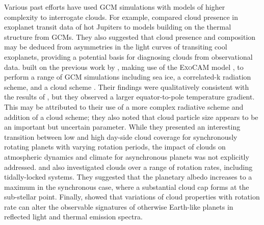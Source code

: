 Various past efforts have used GCM simulations with models of higher complexity to interrogate clouds. For example, \citet{parmentier2016-TRANSITIONS} compared cloud presence in exoplanet transit data of hot Jupiters to models building on the thermal structure from GCMs. They also suggested that cloud presence and composition may be deduced from asymmetries in the light curves of transiting cool exoplanets, providing a potential basis for diagnosing clouds from observational data. \citet{komacek2019-Atmospheric} built on the previous work by \citet{kaspi2015-ATMOSPHERIC}, making use of the \textsc{ExoCAM} model \citep{wolf2022-ExoCAM}, to perform a range of GCM simulations including sea ice, a correlated-k radiation scheme, and a cloud scheme \citep{rasch1998-Comparison}. Their findings were qualitatively consistent with the results of \citet{kaspi2015-ATMOSPHERIC}, but they observed a larger equator-to-pole temperature gradient. This may be attributed to their use of a more complex radiative scheme and addition of a cloud scheme; they also noted that cloud particle size appears to be an important but uncertain parameter. While they presented an interesting transition between low and high day-side cloud coverage for synchronously rotating planets with varying rotation periods, the impact of clouds on atmospheric dynamics and climate for asynchronous planets was not explicitly addressed. \citet{yang2013-STABILIZING} and \citet{yang2014-STRONG} also investigated clouds over a range of rotation rates, including tidally-locked systems. They suggested that the planetary albedo increases to a maximum in the synchronous case, where a substantial cloud cap forms at the sub-stellar point. Finally, \citet{guzewich2020} showed that variations of cloud properties with rotation rate can alter the observable signatures of otherwise Earth-like planets in reflected light and thermal emission spectra.

